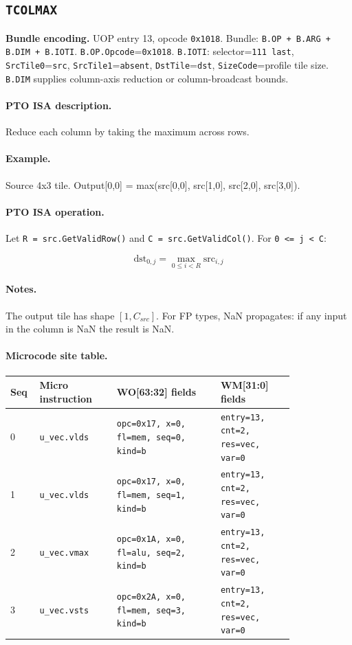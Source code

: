 \subsection{\texttt{TCOLMAX}}
\noindent\textbf{Bundle encoding.} UOP entry 13, opcode \texttt{0x1018}. Bundle: \texttt{B.OP + B.ARG + B.DIM + B.IOTI}. \texttt{B.OP.Opcode}=\texttt{0x1018}. \texttt{B.IOTI}: selector=\texttt{111 last}, \texttt{SrcTile0}=\texttt{src}, \texttt{SrcTile1}=\texttt{absent}, \texttt{DstTile}=\texttt{dst}, \texttt{SizeCode}=profile tile size. \texttt{B.DIM} supplies column-axis reduction or column-broadcast bounds.\par\smallskip
{\small
\paragraph{PTO ISA description.}
Reduce each column by taking the maximum across rows.
\paragraph{Example.}
Source 4x3 tile. Output[0,0] = max(src[0,0], src[1,0], src[2,0], src[3,0]).
\par\smallskip
\paragraph{PTO ISA operation.}
Let \texttt{R = src.GetValidRow()} and \texttt{C = src.GetValidCol()}. For \texttt{0 \textless{}= j \textless{} C}:

\[
\mathrm{dst}_{0,j} = \max_{0 \le i < R} \mathrm{src}_{i,j}
\]
}\par\smallskip
\paragraph{Notes.}
The output tile has shape $[1, C_{src}]$. For FP types, NaN propagates: if any input in the column is NaN the result is NaN.
\paragraph{Microcode site table.}
{\scriptsize
\begin{longtable}{@{}R{0.055\linewidth}L{0.23\linewidth}L{0.31\linewidth}L{0.22\linewidth}@{}}
\toprule
Seq & Micro instruction & WO[63:32] fields & WM[31:0] fields \\
 & \texttt{u\_vec.vlds} & \texttt{opc=0x17, x=0, fl=mem, seq=0, kind=b} & \texttt{entry=13, cnt=2, res=vec, var=0} \\
1 & \texttt{u\_vec.vlds} & \texttt{opc=0x17, x=0, fl=mem, seq=1, kind=b} & \texttt{entry=13, cnt=2, res=vec, var=0} \\
2 & \texttt{u\_vec.vmax} & \texttt{opc=0x1A, x=0, fl=alu, seq=2, kind=b} & \texttt{entry=13, cnt=2, res=vec, var=0} \\
3 & \texttt{u\_vec.vsts} & \texttt{opc=0x2A, x=0, fl=mem, seq=3, kind=b} & \texttt{entry=13, cnt=2, res=vec, var=0} \\
\bottomrule
\end{longtable}
}
